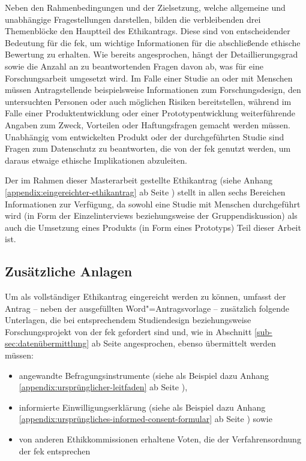 \documentclass[a4paper,12pt,twoside,numbers=noendperiod]{scrreprt}
\begin{document}
\medskip

Neben den Rahmenbedingungen und der Zielsetzung, welche allgemeine und unabhängige Fragestellungen darstellen, bilden die verbleibenden drei Themenblöcke den Hauptteil des Ethikantrags. Diese sind von entscheidender Bedeutung für die \ac{fek}, um wichtige Informationen für die abschließende ethische Bewertung zu erhalten. Wie bereits angesprochen, hängt der Detaillierungsgrad sowie die Anzahl an zu beantwortenden Fragen davon ab, was für eine Forschungsarbeit umgesetzt wird. Im Falle einer Studie an oder mit Menschen müssen Antragstellende beispielsweise Informationen zum Forschungsdesign, den untersuchten Personen oder auch möglichen Risiken bereitstellen, während im Falle einer Produktentwicklung oder einer Prototypentwicklung weiterführende Angaben zum Zweck, Vorteilen oder Haftungsfragen gemacht werden müssen. Unabhängig vom entwickelten Produkt oder der durchgeführten Studie sind Fragen zum Datenschutz zu beantworten, die von der \ac{fek} genutzt werden, um daraus etwaige ethische Implikationen abzuleiten.

Der im Rahmen dieser Masterarbeit gestellte Ethikantrag (siehe Anhang \ref{appendix:eingereichter-ethikantrag} ab Seite \pageref{appendix:eingereichter-ethikantrag}) stellt in allen sechs Bereichen Informationen zur Verfügung, da sowohl eine Studie mit Menschen durchgeführt wird (in Form der Einzelinterviews beziehungsweise der Gruppendiskussion) als auch die Umsetzung eines Produkts (in Form eines Prototyps) Teil dieser Arbeit ist.

\subsection{Zusätzliche Anlagen}
\label{sub-sec:inhaltlicher-aufbau-zusätzliche-anlagen}

Um als vollständiger Ethikantrag eingereicht werden zu können, umfasst der Antrag -- neben der ausgefüllten Word"=Antragsvorlage -- zusätzlich folgende Unterlagen, die bei entsprechendem Studiendesign beziehungsweise Forschungsprojekt von der \ac{fek} gefordert sind \cite{fachhochschule_vorarlberg_gmbh_forschungsethik-kommission_2021} und, wie in Abschnitt \ref{sub-sec:datenübermittlung} ab Seite \pageref{sub-sec:datenübermittlung} angesprochen, ebenso übermittelt werden müssen:
\begin{itemize}
    \item angewandte Befragungsinstrumente (siehe als Beispiel dazu Anhang \ref{appendix:ursprünglicher-leitfaden} ab Seite \pageref{appendix:ursprünglicher-leitfaden}),
    \item informierte Einwilligungserklärung (siehe als Beispiel dazu Anhang \ref{appendix:ursprüngliches-informed-consent-formular} ab Seite \pageref{appendix:ursprüngliches-informed-consent-formular}) sowie
    \item von anderen Ethikkommissionen erhaltene Voten, die der Verfahrensordnung der \ac{fek} entsprechen
\end{itemize}
\end{document}

